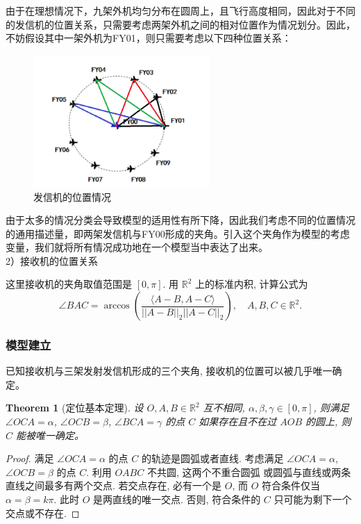 \documentclass{my_paper}
\newcommand{\R}{\mathbb{R}}
\newtheorem{theorem}{Theorem}
\begin{document}
由于在理想情况下，九架外机均匀分布在圆周上，且飞行高度相同，因此对于不同的发信机的位置关系，只需要考虑两架外机之间的相对位置作为情况划分。因此，不妨假设其中一架外机为FY01，则只需要考虑以下四种位置关系：

\begin{figure}[H]
    \centering
    \includegraphics[width=0.6\textwidth]{pic1.png}
    \caption{发信机的位置情况} 
\end{figure}

由于太多的情况分类会导致模型的适用性有所下降，因此我们考虑不同的位置情况的通用描述量，即两架发信机与FY00形成的夹角。引入这个夹角作为模型的考虑变量，我们就将所有情况成功地在一个模型当中表达了出来。\\

2）接收机的位置关系

这里接收机的夹角取值范围是 $[0,\pi]$. 用 $\R^2$ 上的标准内积, 计算公式为
$$
    \angle BAC = \arccos (\frac{\langle A-B,A-C\rangle}{||A-B||_2||A-C||_2}),\quad A,B,C\in \R^2.
$$


\subsubsection{模型建立}

已知接收机与三架发射发信机形成的三个夹角, 接收机的位置可以被几乎唯一确定。
\begin{theorem}[定位基本定理]
    设 $O,A,B\in\R^2$ 互不相同, $\alpha,\beta,\gamma\in[0,\pi]$, 则满足 $\angle OCA = \alpha$, $\angle OCB = \beta$, $\angle BCA = \gamma$ 的点 $C$ 
    如果存在且不在过 $AOB$ 的圆上, 则 $C$ 能被唯一确定。
\end{theorem}
\begin{proof}
    满足 $\angle OCA = \alpha$ 的点 $C$ 的轨迹是圆弧或者直线. 考虑满足 $\angle OCA = \alpha$, $\angle OCB = \beta$ 的点 $C$. 
    利用 $OABC$ 不共圆, 这两个不重合圆弧
    或圆弧与直线或两条直线之间最多有两个交点. 若交点存在, 必有一个是 $O$, 而 $O$ 符合条件仅当 $\alpha=\beta=k\pi$. 
    此时 $O$ 是两直线的唯一交点. 否则, 符合条件的 $C$ 只可能为剩下一个交点或不存在. 
\end{proof}
\end{document}
